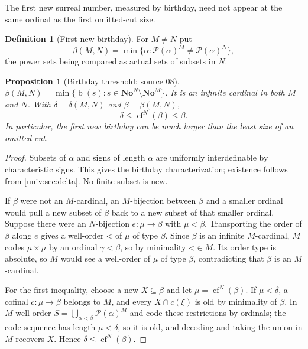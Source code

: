 \documentclass[11pt,letterpaper]{article}
\numberwithin{equation}{section}
\newtheorem{proposition}[proposition]{Proposition}
\theoremstyle{definition}
\newtheorem{definition}[definition]{Definition}
\theoremstyle{remark}
\newcommand{\No}{\mathbf{No}}
\newcommand{\NoM}{\No^{M}}
\newcommand{\NoN}{\No^{N}}
\newcommand{\Pow}{\mathcal P}
\newcommand{\bd}{\operatorname{b}}
\newcommand{\cf}{\operatorname{cf}}
\begin{document}
The first new surreal number, measured by birthday, need not appear at the
same ordinal as the first omitted-cut size.

\begin{definition}[First new birthday]\label{univ:def:beta}
For $M\ne N$ put
\begin{equation}\label{univ:eq:beta}
 \beta(M,N)=\min\{\alpha:\Pow(\alpha)^M\ne\Pow(\alpha)^N\},
\end{equation}
the power sets being compared as actual sets of subsets in $N$.
\end{definition}

\begin{proposition}[Birthday threshold; source 08]\label{univ:prop:beta}
$\beta(M,N)=\min\{\bd(s):s\in\NoN\setminus\NoM\}$. It is an infinite cardinal
in both $M$ and $N$. With $\delta=\delta(M,N)$ and $\beta=\beta(M,N)$,
\begin{equation}\label{univ:eq:deltabeta}
 \delta\le\cf^N(\beta)\le\beta.
\end{equation}
In particular, the first new birthday can be much larger than the least size
of an omitted cut.
\end{proposition}
\begin{proof}
Subsets of $\alpha$ and signs of length $\alpha$ are uniformly interdefinable
by characteristic signs. This gives the birthday characterization; existence
follows from \cref{univ:sec:delta}. No finite subset is new.

If $\beta$ were not an $M$-cardinal, an $M$-bijection between $\beta$ and a
smaller ordinal would pull a new subset of $\beta$ back to a new subset of that
smaller ordinal. Suppose there were an $N$-bijection $e:\mu\to\beta$ with
$\mu<\beta$. Transporting the order of $\beta$ along $e$ gives a well-order
$\triangleleft$ of $\mu$ of type $\beta$. Since $\beta$ is an infinite
$M$-cardinal, $M$ codes $\mu\times\mu$ by an ordinal $\gamma<\beta$, so by
minimality $\triangleleft\in M$. Its order type is absolute, so $M$ would see a
well-order of $\mu$ of type $\beta$, contradicting that $\beta$ is an
$M$-cardinal.

For the first inequality, choose a new $X\subseteq\beta$ and let
$\mu=\cf^N(\beta)$. If $\mu<\delta$, a cofinal $c:\mu\to\beta$ belongs to $M$,
and every $X\cap c(\xi)$ is old by minimality of $\beta$. In $M$ well-order
$S=\bigcup_{\alpha<\beta}\Pow(\alpha)^M$ and code these restrictions by
ordinals; the code sequence has length $\mu<\delta$, so it is old, and
decoding and taking the union in $M$ recovers $X$. Hence
$\delta\le\cf^N(\beta)$.
\end{proof}
\end{document}
